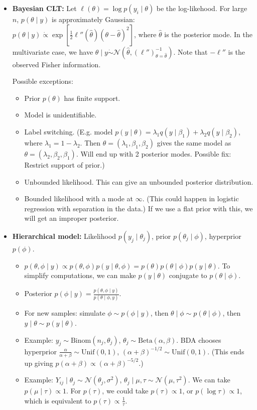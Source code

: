 \documentclass[twoside]{article}
\newcommand{\dis}{\displaystyle}
\newcommand\calN{\mathcal{N}}
\newcommand\lmb{\lambda}
\newcommand\sg{\sigma}
\def\t{\theta}
\begin{document}
\begin{itemize}
\item \textbf{Bayesian CLT:} Let $\ell(\t) = \log p(y_i \mid \t)$ be the log-likehood. For large $n$, $p(\t \mid y)$ is approximately Gaussian: $p(\t \mid y) \dot{\propto} \exp \left[\dis\frac{1}{2}\ell''(\hat{\t})(\t - \hat{\t})^2 \right]$, where $\hat{\t}$ is the posterior mode. In the multivariate case, we have $\t \mid y \dot{\sim} \calN\left( \hat{\t}, (\ell'')^{-1}_{\t = \hat{\t}} \right)$. Note that $-\ell''$ is the observed Fisher information.

Possible exceptions:
\begin{itemize}
\item Prior $p(\t)$ has finite support.
\item Model is unidentifiable.
\item Label switching. (E.g. model $p(y \mid \t) = \lmb_1 q(y \mid \beta_1) + \lmb_2 q(y \mid \beta_2)$, where $\lmb_1 = 1 - \lmb_2$. Then $\t = (\lmb_1, \beta_1, \beta_2)$ gives the same model as $\t = (\lmb_2, \beta_2, \beta_1)$. Will end up with 2 posterior modes. Possible fix: Restrict support of prior.)
\item Unbounded likelihood. This can give an unbounded posterior distribution.
\item Bounded likelihood with a mode at $\infty$. (This could happen in logistic regression with separation in the data.) If we use a flat prior with this, we will get an improper posterior.
\end{itemize}

\item \textbf{Hierarchical model:} Likelihood $p(y_j \mid \t_j)$, prior $p(\t_j \mid \phi)$, hyperprior $p(\phi)$.
\begin{itemize}
\item $p(\t, \phi \mid y) \propto p(\t, \phi) p(y \mid \t, \phi) = p(\t) p(\t \mid \phi) p(y \mid \t)$. To simplify computations, we can make $p(y \mid \t)$ conjugate to $p(\t \mid \phi)$.

\item Posterior $p(\phi \mid y) = \dis\frac{p(\t, \phi \mid y)}{p(\t \mid \phi, y)}$.

\item For new samples: simulate $\phi \sim p(\phi \mid y)$, then $\t \mid \phi \sim p(\t \mid \phi)$, then $y \mid \t \sim p(y \mid \t)$.

\item Example: $y_j \sim \text{Binom}(n_j, \t_j)$, $\t_j \sim \text{Beta}(\alpha, \beta)$. BDA chooses hyperprior $\dis\frac{\alpha}{\alpha + \beta} \sim \text{Unif}(0,1)$, $(\alpha + \beta)^{-1/2} \sim \text{Unif}(0,1)$. (This ends up giving $p(\alpha + \beta) \propto (\alpha + \beta)^{-5/2}$.)

\item Example: $Y_{ij} \mid \t_j \sim \calN(\t_j, \sg^2)$, $\t_j \mid \mu, \tau \sim \calN(\mu, \tau^2)$. We can take $p(\mu \mid \tau) \propto 1$. For $p(\tau)$, we could take $p(\tau) \propto 1$, or $p(\log \tau) \propto 1$, which is equivalent to $p(\tau) \propto \dis\frac{1}{\tau}$.
\end{itemize}

\end{itemize}
\end{document}

